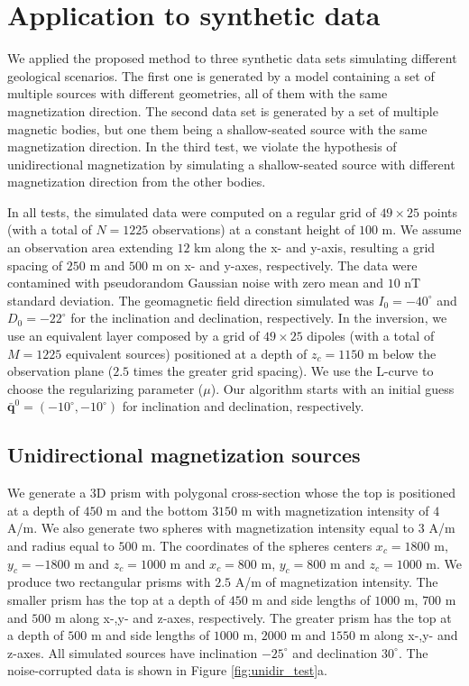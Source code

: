 \section{Application to synthetic data}
\label{sec:synt_tests}

We applied the proposed method to three synthetic data sets simulating different geological scenarios. The first one is generated by a model containing a set of multiple sources with different geometries, all of them with the same magnetization direction. The second data set is generated by a set of multiple magnetic bodies, but one them being a shallow-seated source with the same magnetization direction. In the third test, we violate the hypothesis of unidirectional magnetization by simulating a shallow-seated source with different magnetization direction from the other bodies.

In all tests, the simulated data were computed on a regular grid of $49 \times 25$ points (with a total of $N = 1225$ observations) at a constant height of $100$ m.  We assume an observation area extending $12$ km along the x- and y-axis, resulting a grid spacing of $250$ m and $500$ m on x- and y-axes, respectively. The data were contamined with pseudorandom Gaussian noise with zero mean and $10$ nT standard deviation. The geomagnetic field direction simulated was $I_0 = -40^\circ$ and $D_0 = -22^\circ$ for the inclination and declination, respectively. In the inversion, we use an equivalent layer composed by a grid of $49 \times 25$ dipoles (with a total of $M = 1225$ equivalent sources) positioned at a depth of $z_c = 1150$ m below the observation plane ($2.5$ times the greater grid spacing). We use the L-curve to choose the regularizing parameter ($\mu$). Our algorithm starts with an initial guess $\bar{\mathbf{q}}^{0} = (-10^\circ,-10^\circ)$ for inclination and declination, respectively.

\subsection{Unidirectional magnetization sources}
 
We generate a 3D prism with polygonal cross-section whose the top is positioned at a depth of $450$ m and the bottom $3150$ m with magnetization intensity of $4$ A/m. We also generate two spheres with magnetization intensity equal to $3$ A/m and radius equal to $500$ m. The coordinates of the spheres centers $x_c = 1800$ m, $y_c = -1800$ m and $z_c = 1000$ m and $x_c = 800$ m, $y_c = 800$ m and $z_c= 1000$ m. We produce two rectangular prisms with $2.5$ A/m of magnetization intensity. The smaller prism has the top at a depth of $450$ m and side lengths of $1000$ m, $700$ m and $500$ m along x-,y- and z-axes, respectively. The greater prism has the top at a depth of $500$ m and side lengths of $1000$ m, $2000$ m and $1550$ m along x-,y- and z-axes. All simulated sources have inclination $-25^\circ$ and declination $30^\circ$. The noise-corrupted data is shown in Figure \ref{fig:unidir_test}a. 

